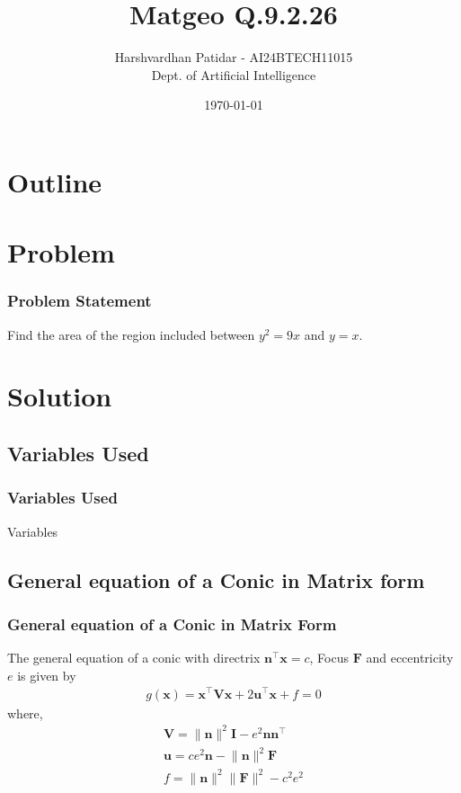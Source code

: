 \documentclass{beamer}
\title{Matgeo Q.9.2.26}
\author{Harshvardhan Patidar - AI24BTECH11015\\Dept. of Artificial Intelligence}
\date{\today}
\providecommand{\brak}[1]{\ensuremath{\left(#1\right)}}
\theoremstyle{remark}
\providecommand{\norm}[1]{\lVert#1\rVert}
\let\vec\mathbf
\numberwithin{equation}{section}
\begin{document}
\begin{frame}
\titlepage
\end{frame}

\section*{Outline}
\begin{frame}
\tableofcontents
\end{frame}
\section{Problem}
\begin{frame}
\frametitle{Problem Statement}
Find the area of the region included between $y^2 = 9x$ and $y=x$.
\end{frame}


\section{Solution}


\subsection{Variables Used}
\begin{frame}
\frametitle{Variables Used}
  \begin{table}[ht]
    \begin{adjustbox}{width=0.8\framewidth}
     
    \end{adjustbox}
    \vspace{0.5cm}
    \caption{Variables}
    \label{table}
  \end{table}
\end{frame}

\subsection{General equation of a Conic in Matrix form}
\begin{frame}
\frametitle{General equation of a Conic in Matrix Form}
  The general equation of a conic with directrix $\vec{n} ^{\top} \vec{x} = c$, Focus $\vec{F}$ and eccentricity $e$ is given by
  \begin{align}
		g\brak{\vec{x}}=\vec{x}^{\top}\vec{V}\vec{x}+2\vec{u}^{\top}\vec{x}+f=0 \label{gen_eq}
  \end{align}
  where,
  \begin{align}
		\vec{V}=\norm{\vec{n}}^2\vec{I}-e^2\vec{n}\vec{n}^{\top} \label{v_eq}\\
		\vec{u}=ce^2\vec{n}-\norm{\vec{n}}^2\vec{F}\\
		f=\norm{\vec{n}}^2\norm{\vec{F}}^2-c^2e^2
	\end{align} 
\end{frame}
\end{document}
